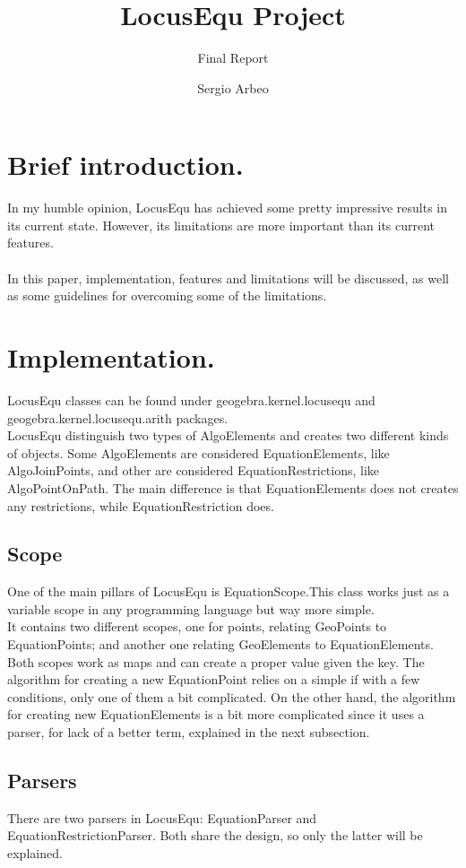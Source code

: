 \documentclass[12pt, oneside, a4paper]{article}
\begin{document}
\title{LocusEqu Project}\subtitle{Final Report}
\author{Sergio Arbeo}\date{}\maketitle

\section{Brief introduction.}

In my humble opinion, LocusEqu has achieved some pretty impressive
results in its current state. However, its limitations are more important than 
its current features.\\\\

In this paper, implementation, features and limitations will be
discussed, as well as some guidelines for overcoming some of the
limitations.

\section{Implementation.}

LocusEqu classes can be found under geogebra.kernel.locusequ and
geogebra.kernel.locusequ.arith packages.\\

LocusEqu distinguish two types of AlgoElements and creates two
different kinds of objects. Some AlgoElements are considered
EquationElements, like AlgoJoinPoints, and other are considered
EquationRestrictions, like AlgoPointOnPath. The main difference is
that EquationElements does not creates any restrictions, while
EquationRestriction does.

\subsection{Scope}

One of the main pillars of LocusEqu is EquationScope.This class works
just as a variable scope in any programming language but way more
simple.\\

It contains two different scopes, one for points, relating GeoPoints
to EquationPoints; and another one relating GeoElements to
EquationElements. Both scopes work as maps and can create a proper
value given the key. The algorithm for creating a new EquationPoint
relies on a simple if with a few conditions, only one of them a bit
complicated. On the other hand, the algorithm for creating new
EquationElements is a bit more complicated since it uses a parser, for
lack of a better term, explained in the next subsection.

\subsection{Parsers}
\label{ss:Parsers}

There are two parsers in LocusEqu: EquationParser and
EquationRestrictionParser. Both share the design, so only the latter
will be explained.\\
\end{document}
